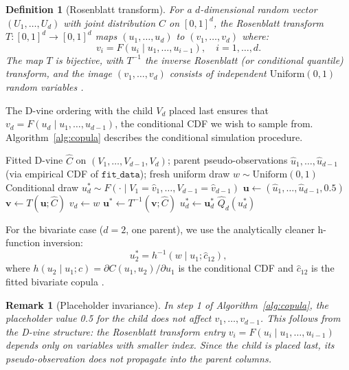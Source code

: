 \documentclass[article]{jss}
\newtheorem{definition}{Definition}
\newtheorem{remark}{Remark}
\begin{document}
\begin{definition}[Rosenblatt transform]
For a $d$-dimensional random vector $(U_1, \ldots, U_d)$ with joint distribution $C$ on $[0,1]^d$, the Rosenblatt transform $T: [0,1]^d \to [0,1]^d$ maps $(u_1, \ldots, u_d)$ to $(v_1, \ldots, v_d)$ where:
\[
v_i = F(u_i \mid u_1, \ldots, u_{i-1}), \quad i = 1, \ldots, d.
\]
The map $T$ is bijective, with $T^{-1}$ the inverse Rosenblatt (or conditional quantile) transform, and the image $(v_1, \ldots, v_d)$ consists of independent $\text{Uniform}(0,1)$ random variables \citep{rosenblatt1952remarks}.
\end{definition}

The D-vine ordering with the child $V_d$ placed last ensures that $v_d = F(u_d \mid u_1, \ldots, u_{d-1})$, the conditional CDF we wish to sample from. Algorithm~\ref{alg:copula} describes the conditional simulation procedure.

\begin{algorithm}
\caption{Copula conditional simulation (D-vine)}
\label{alg:copula}
\begin{algorithmic}[1]
\Require Fitted D-vine $\hat{C}$ on $(V_1, \ldots, V_{d-1}, V_d)$; parent pseudo-observations $\hat{u}_1, \ldots, \hat{u}_{d-1}$ (via empirical CDF of $\mathtt{fit\_data}$); fresh uniform draw $w \sim \text{Uniform}(0,1)$
\Ensure Conditional draw $u_d^* \sim F(\cdot \mid V_1 = \hat{v}_1, \ldots, V_{d-1} = \hat{v}_{d-1})$
\State $\mathbf{u} \leftarrow (\hat{u}_1, \ldots, \hat{u}_{d-1}, 0.5)$ 
\State $\mathbf{v} \leftarrow T(\mathbf{u}; \hat{C})$ 
\State $v_d \leftarrow w$ 
\State $\mathbf{u}^* \leftarrow T^{-1}(\mathbf{v}; \hat{C})$ 
\State $u_d^* \leftarrow \mathbf{u}^*_d$
\State \Return $\hat{Q}_d(u_d^*)$ 
\end{algorithmic}
\end{algorithm}

For the bivariate case ($d = 2$, one parent), we use the analytically cleaner h-function inversion:
\[
u_2^* = h^{-1}(w \mid u_1; \hat{c}_{12}),
\]
where $h(u_2 \mid u_1; c) = \partial C(u_1, u_2) / \partial u_1$ is the conditional CDF and $\hat{c}_{12}$ is the fitted bivariate copula \citep{joe2014dependence}.

\begin{remark}[Placeholder invariance]
In step 1 of Algorithm~\ref{alg:copula}, the placeholder value 0.5 for the child does not affect $v_1, \ldots, v_{d-1}$. This follows from the D-vine structure: the Rosenblatt transform entry $v_i = F(u_i \mid u_1, \ldots, u_{i-1})$ depends only on variables with smaller index. Since the child is placed last, its pseudo-observation does not propagate into the parent columns.
\end{remark}
\end{document}
